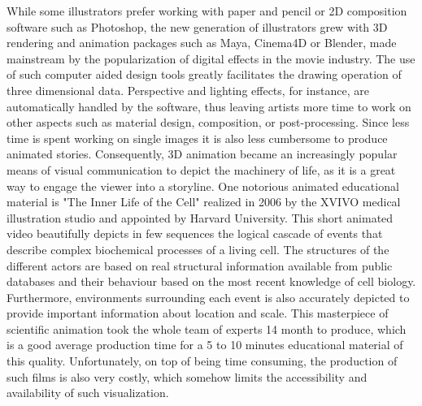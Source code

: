 While some illustrators prefer working with paper and pencil or 2D composition software such as Photoshop, the new generation of illustrators grew with 3D rendering and animation packages such as Maya, Cinema4D or Blender, made mainstream by the popularization of digital effects in the movie industry.
The use of such computer aided design tools greatly facilitates the drawing operation of three dimensional data.
Perspective and lighting effects, for instance, are automatically handled by the software, thus leaving artists more time to work on other aspects such as material design, composition, or post-processing.
Since less time is spent working on single images it is also less cumbersome to produce animated stories.
Consequently, 3D animation became an increasingly popular means of visual communication to depict the machinery of life, as it is a great way to engage the viewer into a storyline.
One notorious animated educational material is "The Inner Life of the Cell" \cite{inner2006} realized in 2006 by the XVIVO medical illustration studio and appointed by Harvard University.
This short animated video beautifully depicts in few sequences the logical cascade of events that describe complex biochemical processes of a living cell.
The structures of the different actors are based on real structural information available from public databases and their behaviour based on the most recent knowledge of cell biology.
Furthermore, environments surrounding each event is also accurately depicted to provide important information about location and scale.
This masterpiece of scientific animation took the whole team of experts 14 month to produce, which is a good average production time for a 5 to 10 minutes educational material of this quality.
Unfortunately, on top of being time consuming, the production of such films is also very costly, which somehow limits the accessibility and availability of such visualization.

